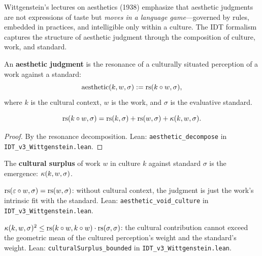 Wittgenstein's lectures on aesthetics (1938) emphasize that aesthetic judgments
are not expressions of taste but \emph{moves in a language game}---governed by
rules, embedded in practices, and intelligible only within a culture. The
IDT formalism captures the structure of aesthetic judgment through the
composition of culture, work, and standard.

\begin{definition}
\label{def:aesthetic-judgment}
An \textbf{aesthetic judgment} is the resonance of a culturally situated
perception of a work against a standard:
\[
\mathrm{aesthetic}(k, w, \sigma) := \mathrm{rs}(k \circ w, \sigma),
\]
where $k$ is the cultural context, $w$ is the work, and $\sigma$ is the
evaluative standard.
\end{definition}

\begin{theorem}
\label{thm:aesthetic-decompose}
\[
\mathrm{rs}(k \circ w, \sigma) = \mathrm{rs}(k, \sigma) + \mathrm{rs}(w, \sigma)
+ \kappa(k, w, \sigma).
\]
\end{theorem}

\begin{proof}
By the resonance decomposition.
Lean: \texttt{aesthetic\_decompose} in \texttt{IDT\_v3\_Wittgenstein.lean}.
\end{proof}

\begin{definition}
The \textbf{cultural surplus} of work $w$ in culture $k$ against standard
$\sigma$ is the emergence: $\kappa(k, w, \sigma)$.
\end{definition}

\begin{theorem}
\label{thm:aesthetic-void-culture}
$\mathrm{rs}(\varepsilon \circ w, \sigma) = \mathrm{rs}(w, \sigma)$: without cultural context,
the judgment is just the work's intrinsic fit with the standard.
Lean: \texttt{aesthetic\_void\_culture} in \texttt{IDT\_v3\_Wittgenstein.lean}.
\end{theorem}

\begin{theorem}
\label{thm:cultural-surplus-bounded}
$\kappa(k, w, \sigma)^2 \leq \mathrm{rs}(k \circ w, k \circ w) \cdot
\mathrm{rs}(\sigma, \sigma)$: the cultural contribution cannot exceed the
geometric mean of the cultured perception's weight and the standard's weight.
Lean: \texttt{culturalSurplus\_bounded} in \texttt{IDT\_v3\_Wittgenstein.lean}.
\end{theorem}

